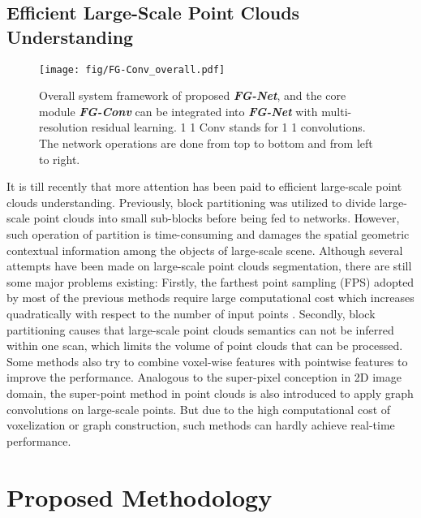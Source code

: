 \documentclass[journal]{IEEEtran}
\begin{document}
 
\subsection{Efficient Large-Scale Point Clouds Understanding} 
\begin{figure*}[htbp!]
      \centering
      \texttt{[image: fig/FG-Conv\_overall.pdf]}
      \caption{Overall system framework of proposed \textit{\textbf{FG-Net}}, and the core module \textit{\textbf{FG-Conv}} can be integrated into \textit{\textbf{FG-Net}} with multi-resolution residual learning. 1  1 Conv stands for 1  1 convolutions. The network operations are done from top to bottom and from left to right.}
      \label{fig_overall}
\end{figure*}
It is till recently that more attention has been paid to efficient large-scale point clouds understanding. Previously, block partitioning\cite{qi2017pointnet++}\cite{qi2017pointnet}\cite{wu2019pointconv} was utilized to divide large-scale point clouds into small  sub-blocks before being fed to networks. However, such operation of partition is time-consuming and damages the spatial geometric contextual information among the objects of large-scale scene. 
Although several attempts \cite{landrieu2019point}  \cite{liu2019point} \cite{hu2020randla} have been made on large-scale point clouds segmentation, there are still some major problems existing: Firstly,  the farthest point sampling (FPS) adopted by most of the previous methods require large computational cost which increases quadratically\cite{wang2019re} with respect to the number of input points . Secondly,  block partitioning causes that large-scale point clouds semantics can not be inferred within one scan, which limits the volume of point clouds that can be processed. Some methods \cite{liu2019point} \cite{shi2020pv} also try to combine voxel-wise features with pointwise features to improve the performance. Analogous to the super-pixel conception in 2D image domain, the super-point \cite{landrieu2019point} method in point clouds is also introduced to apply graph convolutions on large-scale points. But due to the high computational cost of voxelization or graph construction, such methods can hardly achieve real-time performance.



\section{Proposed Methodology} 
\end{document}
